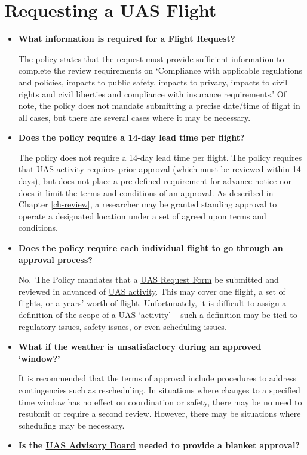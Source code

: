 \documentclass[
]{book}
\begin{document}
\hypertarget{requesting-a-uas-flight}{%
\section{Requesting a UAS Flight}\label{requesting-a-uas-flight}}

\begin{itemize}
\item
  \textbf{What information is required for a Flight Request?}

  The policy states that the request must provide sufficient information to complete the review requirements on `Compliance with applicable regulations and policies, impacts to public safety, impacts to privacy, impacts to civil rights and civil liberties and compliance with insurance requirements.' Of note, the policy does not mandate submitting a precise date/time of flight in all cases, but there are several cases where it may be necessary.
\item
  \textbf{Does the policy require a 14-day lead time per flight?}

  The policy does not require a 14-day lead time per flight. The policy requires that \protect\hyperlink{UASactivity}{UAS activity} requires prior approval (which must be reviewed within 14 days), but does not place a pre-defined requirement for advance notice nor does it limit the terms and conditions of an approval. As described in Chapter \ref{ch-review}, a researcher may be granted standing approval to operate a designated location under a set of agreed upon terms and conditions.
\item
  \textbf{Does the policy require each individual flight to go through an approval process?}

  No.~The Policy mandates that a \protect\hyperlink{FR}{UAS Request Form} be submitted and reviewed in advanced of \protect\hyperlink{UASactivity}{UAS activity}. This may cover one flight, a set of flights, or a years' worth of flight. Unfortunately, it is difficult to assign a definition of the scope of a UAS `activity' -- such a definition may be tied to regulatory issues, safety issues, or even scheduling issues.
\item
  \textbf{What if the weather is unsatisfactory during an approved `window?'}

  It is recommended that the terms of approval include procedures to address contingencies such as rescheduling. In situations where changes to a specified time window has no effect on coordination or safety, there may be no need to resubmit or require a second review. However, there may be situations where scheduling may be necessary.
\item
  \textbf{Is the \protect\hyperlink{AB}{UAS Advisory Board} needed to provide a blanket approval?}


\end{itemize}
\end{document}
